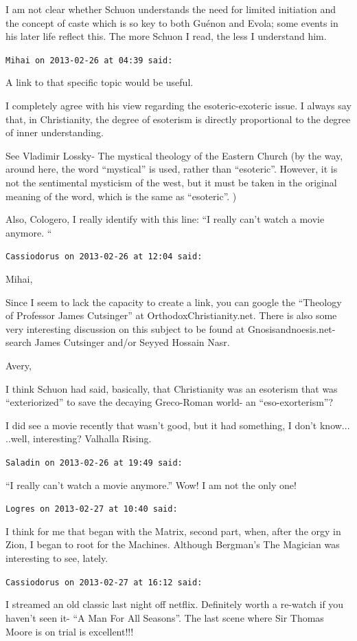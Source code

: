 \begin{footnotesize}
\begin{sffamily}
I am not clear whether Schuon understands the need for limited initiation and the concept of caste which is so key to both Guénon and Evola; some events in his later life reflect this. The more Schuon I read, the less I understand him.

\hfill

\texttt{Mihai on 2013-02-26 at 04:39 said:}

A link to that specific topic would be useful.

I completely agree with his view regarding the esoteric-exoteric issue. I always say that, in Christianity, the degree of esoterism is directly proportional to the degree of inner understanding.

See Vladimir Lossky- The mystical theology of the Eastern Church (by the way, around here, the word ``mystical'' is used, rather than ``esoteric''. However, it is not the sentimental mysticism of the west, but it must be taken in the original meaning of the word, which is the same as ``esoteric''. )

Also, Cologero, I really identify with this line: ``I really can't watch a movie anymore. ``

\hfill

\texttt{Cassiodorus on 2013-02-26 at 12:04 said:}

Mihai,

Since I seem to lack the capacity to create a link, you can google the ``Theology of Professor James Cutsinger'' at OrthodoxChristianity.net. There is also some very interesting discussion on this subject to be found at Gnosisandnoesis.net- search James Cutsinger and/or Seyyed Hossain Nasr.

Avery,

I think Schuon had said, basically, that Christianity was an esoterism that was ``exteriorized'' to save the decaying Greco-Roman world- an ``eso-exorterism''?

I did see a movie recently that wasn't good, but it had something, I don't know... ..well, interesting? Valhalla Rising.

\hfill

\texttt{Saladin on 2013-02-26 at 19:49 said:}

``I really can't watch a movie anymore.'' Wow! I am not the only one!

\hfill

\texttt{Logres on 2013-02-27 at 10:40 said:}

I think for me that began with the Matrix, second part, when, after the orgy in Zion, I began to root for the Machines. Although Bergman's The Magician was interesting to see, lately.

\hfill

\texttt{Cassiodorus on 2013-02-27 at 16:12 said:}

I streamed an old classic last night off netflix. Definitely worth a re-watch if you haven't seen it- ``A Man For All Seasons''. The last scene where Sir Thomas Moore is on trial is excellent!!!

\end{sffamily}
\end{footnotesize}


